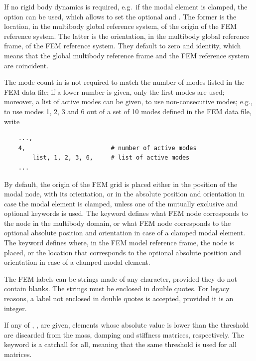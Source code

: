 If no rigid body dynamics is required, e.g.\ if the modal element
is clamped, the  option can be used, which allows
to set the optional 
and .
The former is the location, in the multibody
global reference system, of the origin of the FEM reference system.
The latter is the orientation,
in the multibody global reference frame,
of the FEM reference system.
They default to zero and identity, which means
that the global multibody reference frame
and the FEM reference system are coincident.

The mode count in  is not required to match
the number of modes listed in the FEM data file; if a lower number
is given, only the first  modes are used;
moreover, a list of active modes can be given, to use non-consecutive
modes; e.g., to use modes 1, 2, 3 and 6 out of a set of 10 modes
defined in the FEM data file, write
\begin{verbatim}
    ...,
    4,                        # number of active modes
        list, 1, 2, 3, 6,     # list of active modes
    ...
\end{verbatim}

By default, the origin of the FEM grid is placed either in the position
of the modal node, with its orientation, or in the absolute position 
and orientation in case the modal element is clamped, 
unless one of the mutually exclusive  
and  optional keywords is used.
The  keyword defines what FEM node corresponds 
to the  node in the multibody domain,
or what FEM node corresponds to the optional absolute position 
and orientation in case of a clamped modal element.
The  keyword defines where, in the FEM model
reference frame, the  node is placed, or the location
that corresponds to the optional absolute position and orientation
in case of a clamped modal element.

The FEM labels can be strings made of any character,
provided they do not contain blanks.
The strings must be enclosed in double quotes.
For legacy reasons, a label not enclosed in double quotes
is accepted, provided it is an integer.

If any of , ,  are given,
elements whose absolute value is lower than the threshold
are discarded from the mass, damping and stiffness matrices, respectively.
The keyword  is a catchall for all,
meaning that the same threshold is used for all matrices.

